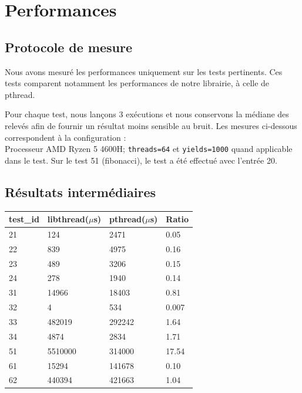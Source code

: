 \section{Performances}

\subsection{Protocole de mesure}
Nous avons mesuré les performances uniquement sur les tests pertinents. Ces tests comparent notamment les performances de notre librairie, à celle de pthread.

Pour chaque test, nous lançons 3 exécutions et nous conservons la médiane des relevés afin de fournir un résultat moins sensible au bruit.
Les mesures ci-dessous correspondent à la configuration : \\
Processeur AMD Ryzen 5 4600H; \texttt{threads=64} et \texttt{yields=1000} quand applicable dans le test. Sur le test 51 (fibonacci), le test a été effectué avec l'entrée 20.

\subsection{Résultats intermédiaires}
\begin{table}[!ht]
    \centering
    \begin{tabular}{|l|l|l|l|}
    \hline
    test\_id & libthread($\mu$s) & pthread($\mu$s)  & Ratio \\ \hline
    21 & 124 & 2471 & 0.05\\ \hline
    22 & 839 & 4975 & 0.16\\ \hline
    23 & 489 & 3206 & 0.15\\ \hline
    24 & 278 & 1940 & 0.14\\ \hline
        31 & 14966 & 18403 &0.81\\ \hline
        32 & 4 & 534 & 0.007\\ \hline
        33 & 482019 & 292242 & 1.64\\ \hline
        34 & 4874 & 2834 & 1.71\\ \hline
        51 & 5510000 & 314000 & 17.54 \\ \hline
        61 & 15294 & 141678 & 0.10\\ \hline
        62 & 440394 & 421663 & 1.04\\ \hline
    \end{tabular}
\end{table}

